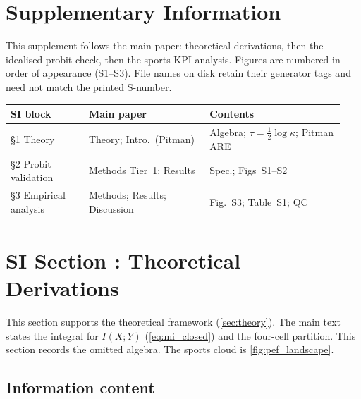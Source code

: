 
\clearpage
\setcounter{figure}{0}
\renewcommand{\thefigure}{S\arabic{figure}}
\setcounter{table}{0}
\renewcommand{\thetable}{S\arabic{table}}

\section*{Supplementary Information}

\noindent This supplement follows the main paper: theoretical derivations, then the idealised probit check, then the sports KPI analysis. Figures are numbered in order of appearance (S1--S3). File names on disk retain their generator tags and need not match the printed S-number.

\medskip
\noindent\begin{tabular}{@{}p{0.22\linewidth}p{0.34\linewidth}p{0.38\linewidth}@{}}
  \toprule
  \textbf{SI block} & \textbf{Main paper} & \textbf{Contents} \\
  \midrule
  \S1 Theory & Theory; Intro.\ (Pitman) & Algebra; $\tau=\tfrac12\log\kappa$; Pitman ARE \\
  \S2 Probit validation & Methods Tier~1; Results & Spec.; Figs~S1--S2 \\
  \S3 Empirical analysis & Methods; Results; Discussion & Fig.~S3; Table~S1; QC \\
  \bottomrule
\end{tabular}

\clearpage

\section*{SI Section \thesisection: Theoretical Derivations}
\label{sec:si_maths}

\noindent This section supports the theoretical framework (\cref{sec:theory}). The main text states the integral for $I(X;Y)$ (\cref{eq:mi_closed}) and the four-cell partition. This section records the omitted algebra. The sports cloud is \cref{fig:pef_landscape}.



\subsection*{Information content}
\label{sec:si_theory}

